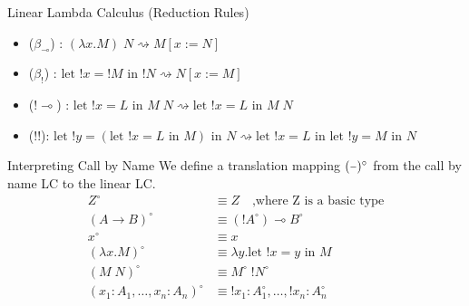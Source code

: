 \documentclass[10pt]{beamer}
\newcommand{\lam}[2]{\lambda #1 . #2}
\newcommand{\llet}[3]{\text{let }  ! #1 = #2 \text{ in } #3}
\newcommand{\app}[2]{#1 \; #2}
\newcommand{\subst}[2]{[#1 := #2]}
\newcommand{\minus}{\scalebox{0.75}[1.0]{$-$}}
\begin{document}
\begin{frame}[fragile]{Linear Lambda Calculus (Reduction Rules)}
  \begin{itemize}
    \item ($\beta_{\multimap}$) : $\app{(\lam{x}{M})}{N} \rightsquigarrow M \subst{x}{N}$
    \item ($\beta_{!}$) : $\llet{x}{! M}{! N} \rightsquigarrow N \subst{x}{M}$
    \item ($! \multimap$) : $\app{\llet{x}{L}{M}}{N}  \rightsquigarrow \llet{x}{L}{\app{M}{N}}$
    \item ($! !$): $\llet{y}{(\llet{x}{L}{M})}{N} \rightsquigarrow \llet{x}{L}{\llet{y}{M}{N}}$
  \end{itemize}
\end{frame}

\begin{frame}[fragile]{Interpreting Call by Name}
  We define a translation mapping $(\minus)^\circ$ from the call by name LC to the linear LC. \\

  \begin{align*}
    Z^\circ                             & \equiv Z \quad \text{,where Z is a basic type}     \\
    (A \rightarrow B)^\circ             & \equiv (! A^\circ) \multimap B^\circ               \\
    x^\circ                             & \equiv x                                           \\
    (\lam{x}{M})^\circ                  & \equiv \lam{y}{\llet{x}{y}{M}}                     \\
    (\app{M}{N})^\circ                  & \equiv \app{M^\circ}{! N^\circ}                    \\
    (x_1 : A_1, \dots, x_n : A_n)^\circ & \equiv ! x_1 : A_1^\circ, \dots, ! x_n : A_n^\circ \\
  \end{align*}

\end{frame}
\end{document}
